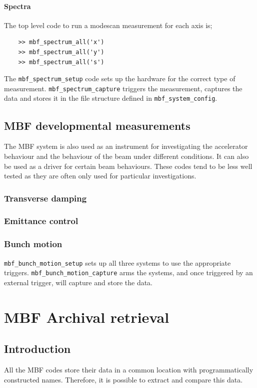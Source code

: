 \documentclass{report}
\begin{document}
\subsubsection{Spectra}
The top level code to run a modescan measurement for each axis is; 
\begin{verbatim}
    >> mbf_spectrum_all('x') 
    >> mbf_spectrum_all('y') 
    >> mbf_spectrum_all('s') 
\end{verbatim}

The \verb|mbf_spectrum_setup| code sets up the hardware for the correct type of measurement. \verb|mbf_spectrum_capture| triggers the measurement, captures the data and stores it in the file structure defined in \verb|mbf_system_config|. 

\section{MBF developmental measurements}
The MBF system is also used as an instrument for investigating the accelerator behaviour and the behaviour of the beam under different conditions. It can also be used as a driver for certain beam behaviours. These codes tend to be less well tested as they are often only used for particular investigations.
\subsection{Transverse damping}
\subsection{Emittance control}
\subsection{Bunch motion}
 \verb|mbf_bunch_motion_setup| sets up all three systems to use the appropriate triggers. \verb|mbf_bunch_motion_capture| arms the systems, and once triggered by an external trigger, will capture and store the data.

\chapter{MBF Archival retrieval}

\section{Introduction}

All the MBF codes store their data in a common location with programmatically constructed names. Therefore, it is possible to extract and compare this data. 
\end{document}
